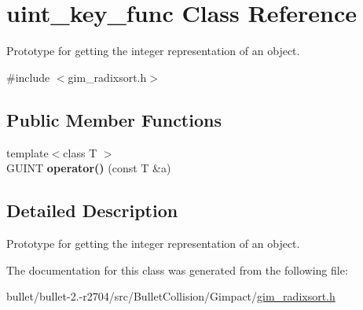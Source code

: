 \hypertarget{classuint__key__func}{\section{uint\+\_\+key\+\_\+func Class Reference}
\label{classuint__key__func}
}


Prototype for getting the integer representation of an object.  




{\ttfamily \#include $<$gim\+\_\+radixsort.\+h$>$}

\subsection*{Public Member Functions}
\begin{DoxyCompactItemize}
\item 
\hypertarget{classuint__key__func_ada049ee7335acea315ab815356cf8577}{{\footnotesize template$<$class T $>$ }\\G\+U\+I\+N\+T {\bfseries operator()} (const T \&a)}\label{classuint__key__func_ada049ee7335acea315ab815356cf8577}

\end{DoxyCompactItemize}


\subsection{Detailed Description}
Prototype for getting the integer representation of an object. 

The documentation for this class was generated from the following file\+:\begin{DoxyCompactItemize}
\item 
bullet/bullet-\/2.-\/r2704/src/\+Bullet\+Collision/\+Gimpact/\hyperlink{gim__radixsort_8h}{gim\+\_\+radixsort.\+h}\end{DoxyCompactItemize}
